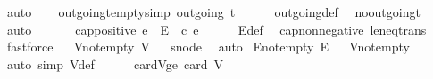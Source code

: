 \begin{isabellebody}
\ auto%
\endisatagproof
{\isafoldproof}%
%
\isadelimproof
\isanewline
%
\endisadelimproof
\ \ \isanewline
{}\isamarkupfalse%
\ outgoing{\isacharunderscore}t{\isacharunderscore}empty{\isacharbrackleft}simp{\isacharbrackright}{\isacharcolon}\ {\isachardoublequoteopen}outgoing\ t\ {\isacharequal}\ {\isacharbraceleft}{\isacharbraceright}{\isachardoublequoteclose}\isanewline
%
\isadelimproof
\ \ %
\endisadelimproof
%
\isatagproof
{}\isamarkupfalse%
\ outgoing{\isacharunderscore}def\ \isamarkupfalse%
\ no{\isacharunderscore}outgoing{\isacharunderscore}t\ \isamarkupfalse%
\ auto%
\endisatagproof
{\isafoldproof}%
%
\isadelimproof
\isanewline
%
\endisadelimproof
\ \ \isanewline
\ \ \isanewline
{}\isamarkupfalse%
\ cap{\isacharunderscore}positive{\isacharcolon}\ {\isachardoublequoteopen}e\ {\isasymin}\ E\ {\isasymLongrightarrow}\ c\ e\ {\isachargreater}\ {}{\isachardoublequoteclose}\isanewline
%
\isadelimproof
\ \ %
\endisadelimproof
%
\isatagproof
{}\isamarkupfalse%
\ E{\isacharunderscore}def\ \isamarkupfalse%
\ cap{\isacharunderscore}non{\isacharunderscore}negative\ le{\isacharunderscore}neq{\isacharunderscore}trans\ \isamarkupfalse%
\ fastforce%
\endisatagproof
{\isafoldproof}%
%
\isadelimproof
\ \isanewline
%
\endisadelimproof
\isanewline
{}\isamarkupfalse%
\ V{\isacharunderscore}not{\isacharunderscore}empty{\isacharcolon}\ {\isachardoublequoteopen}V{\isasymnoteq}{\isacharbraceleft}{\isacharbraceright}{\isachardoublequoteclose}%
\isadelimproof
\ %
\endisadelimproof
%
\isatagproof
{}\isamarkupfalse%
\ s{\isacharunderscore}node\ \isamarkupfalse%
\ auto%
\endisatagproof
{\isafoldproof}%
%
\isadelimproof
%
\endisadelimproof
\isanewline
{}\isamarkupfalse%
\ E{\isacharunderscore}not{\isacharunderscore}empty{\isacharcolon}\ {\isachardoublequoteopen}E{\isasymnoteq}{\isacharbraceleft}{\isacharbraceright}{\isachardoublequoteclose}%
\isadelimproof
\ %
\endisadelimproof
%
\isatagproof
{}\isamarkupfalse%
\ V{\isacharunderscore}not{\isacharunderscore}empty\ \isamarkupfalse%
\ {\isacharparenleft}auto\ simp{\isacharcolon}\ V{\isacharunderscore}def{\isacharparenright}%
\endisatagproof
{\isafoldproof}%
%
\isadelimproof
%
\endisadelimproof
\isanewline
\ \ \ \ \isanewline
{}\isamarkupfalse%
\ card{\isacharunderscore}V{\isacharunderscore}ge{}{\isacharcolon}\ {\isachardoublequoteopen}card\ V\ {\isasymge}\ {}{\isachardoublequoteclose}\isanewline

\end{isabellebody}
